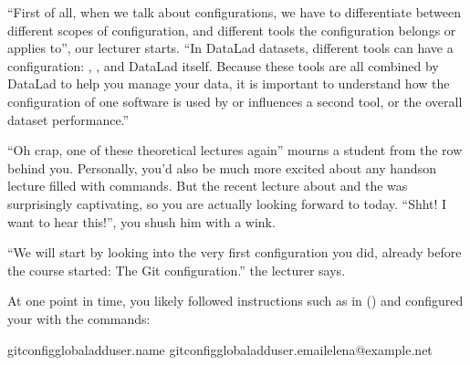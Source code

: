 \sphinxAtStartPar
“First of all, when we talk about configurations, we have
to differentiate between different scopes of configuration,
and different tools the configuration belongs or applies to”,
our lecturer starts. “In DataLad datasets, different tools can
have a configuration: {\hyperref[\detokenize{glossary:term-Git}]{}}, {\hyperref[\detokenize{glossary:term-git-annex}]{}}, and
DataLad itself. Because these tools are all
combined by DataLad to help you manage your data,
it is important to understand how the configuration of one
software is used by or influences a second tool, or the overall
dataset performance.”

\sphinxAtStartPar
“Oh crap, one of these theoretical lectures again” mourns a
student from the row behind you. Personally, you’d also
be much more excited
about any hands\sphinxhyphen{}on lecture filled with commands. But the
recent lecture about {\hyperref[\detokenize{glossary:term-git-annex}]{}} and the {\hyperref[\detokenize{glossary:term-object-tree}]{}}
was surprisingly captivating, so you are actually looking forward to today.
“Shht! I want to hear this!”, you shush him with a wink.

\sphinxAtStartPar
“We will start by looking into the very first configuration
you did, already before the course started: The 
Git configuration.” the lecturer says.

\ignorespaces 
\sphinxAtStartPar
At one point in time, you likely followed instructions such as
in {\hyperref[\detokenize{intro/installation:install}]{}} () and configured your
 with the commands:

\begin{sphinxVerbatim}[commandchars=\\\{\}]
gitconfig\PYGZhy{}\PYGZhy{}global\PYGZhy{}\PYGZhy{}adduser.name
gitconfig\PYGZhy{}\PYGZhy{}global\PYGZhy{}\PYGZhy{}adduser.emailelena@example.net
\end{sphinxVerbatim}

